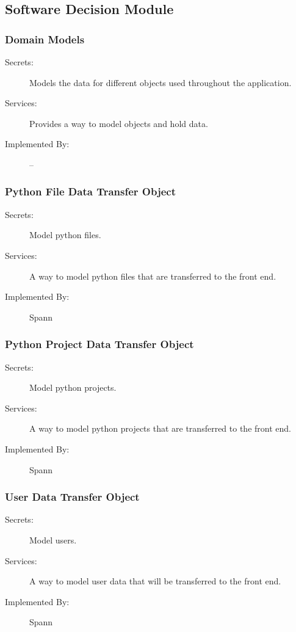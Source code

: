 \documentclass[12pt, titlepage]{article}
\begin{document}
\subsection{Software Decision Module}

\subsubsection{Domain Models}

\begin{description}
\item[Secrets:] Models the data for different objects used throughout the
    application.
\item[Services:] Provides a way to model objects and hold data.
\item[Implemented By:] --
\end{description}

\subsubsection{Python File Data Transfer Object}

\begin{description}
\item[Secrets:] Model python files.
\item[Services:] A way to model python files that are transferred to the front
    end.
\item[Implemented By:] Spann
\end{description}

\subsubsection{Python Project Data Transfer Object}

\begin{description}
\item[Secrets:] Model python projects.
\item[Services:] A way to model python projects that are transferred to the front
    end.
\item[Implemented By:] Spann
\end{description}

\subsubsection{User Data Transfer Object}

\begin{description}
\item[Secrets:] Model users.
\item[Services:] A way to model user data that will be transferred to the front
    end.
\item[Implemented By:] Spann
\end{description}
\end{document}
